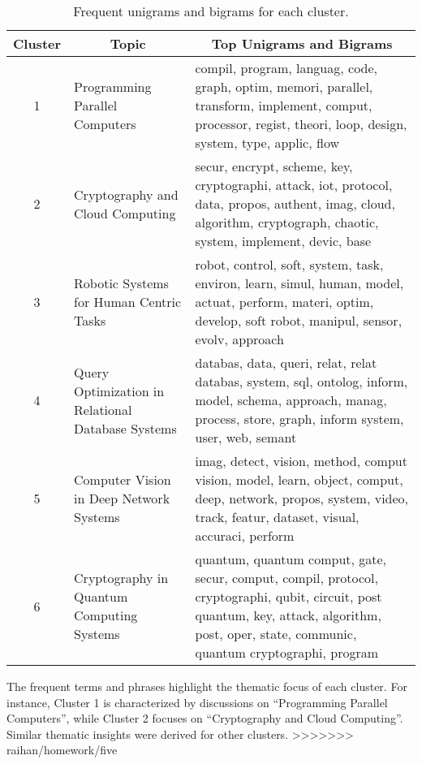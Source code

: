 \begin{table}[h!]
\centering
\begin{tabular}{|c|p{4cm}|p{6cm}|}
\hline 
\multicolumn{1}{|c|}{\textbf{Cluster}} & \multicolumn{1}{c|}{\textbf{Topic}} & \multicolumn{1}{c|}{\textbf{Top Unigrams and Bigrams}} \\
\hline
1 & Programming Parallel Computers & compil, program, languag, code, graph, optim, memori, parallel, transform, implement, comput, processor, regist, theori, loop, design, system, type, applic, flow \\ \hline
2 & Cryptography and Cloud Computing & secur, encrypt, scheme, key, cryptographi, attack, iot, protocol, data, propos, authent, imag, cloud, algorithm, cryptograph, chaotic, system, implement, devic, base \\ \hline
3 & Robotic Systems for Human Centric Tasks & robot, control, soft, system, task, environ, learn, simul, human, model, actuat, perform, materi, optim, develop, soft robot, manipul, sensor, evolv, approach \\ \hline
4 & Query Optimization in Relational Database Systems & databas, data, queri, relat, relat databas, system, sql, ontolog, inform, model, schema, approach, manag, process, store, graph, inform system, user, web, semant \\ \hline
5 & Computer Vision in Deep Network Systems & imag, detect, vision, method, comput vision, model, learn, object, comput, deep, network, propos, system, video, track, featur, dataset, visual, accuraci, perform \\ \hline
6 & Cryptography in Quantum Computing Systems & quantum, quantum comput, gate, secur, comput, compil, protocol, cryptographi, qubit, circuit, post quantum, key, attack, algorithm, post, oper, state, communic, quantum cryptographi, program \\ \hline
\end{tabular}
\caption{Frequent unigrams and bigrams for each cluster.}
\label{tab:ngrams-clusters}
\end{table}

The frequent terms and phrases highlight the thematic focus of each cluster. For instance, Cluster 1 is characterized by discussions on ``Programming Parallel Computers'', while Cluster 2 focuses on ``Cryptography and Cloud Computing''. Similar thematic insights were derived for other clusters.
>>>>>>> raihan/homework/five
